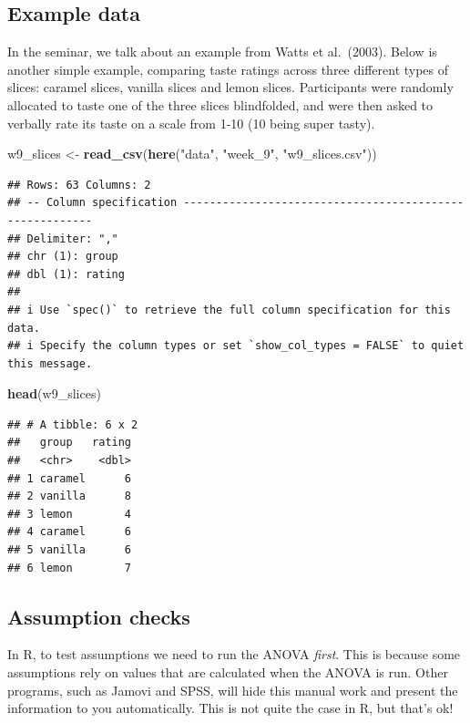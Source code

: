 \documentclass[
]{book}
\newenvironment{Shaded}{\begin{snugshade}}{\end{snugshade}}
\newcommand{\FunctionTok}[1]{\textcolor[rgb]{0.13,0.29,0.53}{\textbf{#1}}}
\newcommand{\NormalTok}[1]{#1}
\newcommand{\OtherTok}[1]{\textcolor[rgb]{0.56,0.35,0.01}{#1}}
\newcommand{\StringTok}[1]{\textcolor[rgb]{0.31,0.60,0.02}{#1}}
\begin{document}
\subsection{Example data}\label{example-data-3}

In the seminar, we talk about an example from Watts et al.~(2003). Below
is another simple example, comparing taste ratings across three
different types of slices: caramel slices, vanilla slices and lemon
slices. Participants were randomly allocated to taste one of the three
slices blindfolded, and were then asked to verbally rate its taste on a
scale from 1-10 (10 being super tasty).

\begin{Shaded}
\begin{Highlighting}[]
\NormalTok{w9\_slices }\OtherTok{\textless{}{-}} \FunctionTok{read\_csv}\NormalTok{(}\FunctionTok{here}\NormalTok{(}\StringTok{"data"}\NormalTok{, }\StringTok{"week\_9"}\NormalTok{, }\StringTok{"w9\_slices.csv"}\NormalTok{))}
\end{Highlighting}
\end{Shaded}

\begin{verbatim}
## Rows: 63 Columns: 2
## -- Column specification --------------------------------------------------------
## Delimiter: ","
## chr (1): group
## dbl (1): rating
## 
## i Use `spec()` to retrieve the full column specification for this data.
## i Specify the column types or set `show_col_types = FALSE` to quiet this message.
\end{verbatim}

\begin{Shaded}
\begin{Highlighting}[]
\FunctionTok{head}\NormalTok{(w9\_slices)}
\end{Highlighting}
\end{Shaded}

\begin{verbatim}
## # A tibble: 6 x 2
##   group   rating
##   <chr>    <dbl>
## 1 caramel      6
## 2 vanilla      8
## 3 lemon        4
## 4 caramel      6
## 5 vanilla      6
## 6 lemon        7
\end{verbatim}

\subsection{Assumption checks}\label{assumption-checks-3}

In R, to test assumptions we need to run the ANOVA \emph{first}. This is because some assumptions rely on values that are calculated when the ANOVA is run. Other programs, such as Jamovi and SPSS, will hide this manual work and present the information to you automatically. This is not quite the case in R, but that's ok!
\end{document}
